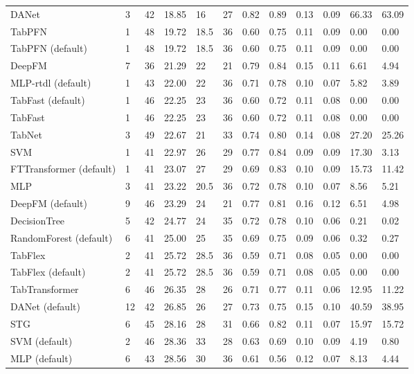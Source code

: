 \begin{tabular}{lllllrllllll}
DANet & 3 & 42 & 18.85 & 16 & 27 & 0.82 & 0.89 & 0.13 & 0.09 & 66.33 & 63.09 \\
TabPFN & 1 & 48 & 19.72 & 18.5 & 36 & 0.60 & 0.75 & 0.11 & 0.09 & 0.00 & 0.00 \\
TabPFN (default) & 1 & 48 & 19.72 & 18.5 & 36 & 0.60 & 0.75 & 0.11 & 0.09 & 0.00 & 0.00 \\
DeepFM & 7 & 36 & 21.29 & 22 & 21 & 0.79 & 0.84 & 0.15 & 0.11 & 6.61 & 4.94 \\
MLP-rtdl (default) & 1 & 43 & 22.00 & 22 & 36 & 0.71 & 0.78 & 0.10 & 0.07 & 5.82 & 3.89 \\
TabFast (default) & 1 & 46 & 22.25 & 23 & 36 & 0.60 & 0.72 & 0.11 & 0.08 & 0.00 & 0.00 \\
TabFast & 1 & 46 & 22.25 & 23 & 36 & 0.60 & 0.72 & 0.11 & 0.08 & 0.00 & 0.00 \\
TabNet & 3 & 49 & 22.67 & 21 & 33 & 0.74 & 0.80 & 0.14 & 0.08 & 27.20 & 25.26 \\
SVM & 1 & 41 & 22.97 & 26 & 29 & 0.77 & 0.84 & 0.09 & 0.09 & 17.30 & 3.13 \\
FTTransformer (default) & 1 & 41 & 23.07 & 27 & 29 & 0.69 & 0.83 & 0.10 & 0.09 & 15.73 & 11.42 \\
MLP & 3 & 41 & 23.22 & 20.5 & 36 & 0.72 & 0.78 & 0.10 & 0.07 & 8.56 & 5.21 \\
DeepFM (default) & 9 & 46 & 23.29 & 24 & 21 & 0.77 & 0.81 & 0.16 & 0.12 & 6.51 & 4.98 \\
DecisionTree & 5 & 42 & 24.77 & 24 & 35 & 0.72 & 0.78 & 0.10 & 0.06 & 0.21 & 0.02 \\
RandomForest (default) & 6 & 41 & 25.00 & 25 & 35 & 0.69 & 0.75 & 0.09 & 0.06 & 0.32 & 0.27 \\
TabFlex & 2 & 41 & 25.72 & 28.5 & 36 & 0.59 & 0.71 & 0.08 & 0.05 & 0.00 & 0.00 \\
TabFlex (default) & 2 & 41 & 25.72 & 28.5 & 36 & 0.59 & 0.71 & 0.08 & 0.05 & 0.00 & 0.00 \\
TabTransformer & 6 & 46 & 26.35 & 28 & 26 & 0.71 & 0.77 & 0.11 & 0.06 & 12.95 & 11.22 \\
DANet (default) & 12 & 42 & 26.85 & 26 & 27 & 0.73 & 0.75 & 0.15 & 0.10 & 40.59 & 38.95 \\
STG & 6 & 45 & 28.16 & 28 & 31 & 0.66 & 0.82 & 0.11 & 0.07 & 15.97 & 15.72 \\
SVM (default) & 2 & 46 & 28.36 & 33 & 28 & 0.63 & 0.69 & 0.10 & 0.09 & 4.19 & 0.80 \\
MLP (default) & 6 & 43 & 28.56 & 30 & 36 & 0.61 & 0.56 & 0.12 & 0.07 & 8.13 & 4.44 \\

\end{tabular}
